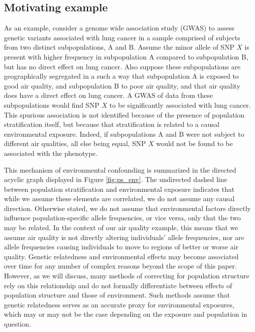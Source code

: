 \subsection{Motivating example}

As an example, consider a genome wide association study (GWAS) to assess genetic variants associated with lung cancer in a sample comprised of subjects from two distinct subpopulations, A and B. Assume the minor allele of SNP $X$ is present with higher frequency in subpopulation A compared to subpopulation B, but has no direct effect on lung cancer. Also suppose these subpopulations are geographically segregated in a such a way that subpopulation A is exposed to good air quality, and subpopulation B to poor air quality, and that air quality does have a direct effect on lung cancer. A GWAS of data from these subpopulations would find SNP $X$ to be significantly associated with lung cancer. This spurious association is not identified because of the presence of population stratification itself, but because that stratification is related to a causal environmental exposure. Indeed, if subpopulations A and B were not subject to different air qualities, all else being equal, SNP $X$ would not be found to be associated with the phenotype.


This mechanism of environmental confounding is summarized in the directed acyclic graph displayed in Figure \ref{fig:ps_env}. The undirected dashed line between population stratification and environmental exposure indicates that while we assume these elements are correlated, we do not assume any causal direction. Otherwise stated, we do not assume that environmental factors directly influence population-specific allele frequencies, or vice versa, only that the two may be related. In the context of our air quality example, this means that we assume air quality is not directly altering individuals' allele frequencies, nor are allele frequencies causing individuals to move to regions of better or worse air quality. Genetic relatedness and environmental effects may become associated over time for any number of complex reasons beyond the scope of this paper. However, as we will discuss, many methods of correcting for population structure rely on this relationship and do not formally differentiate between effects of population structure and those of environment. Such methods assume that genetic relatedness serves as an accurate proxy for environmental exposures, which may or may not be the case depending on the exposure and population in question. 

